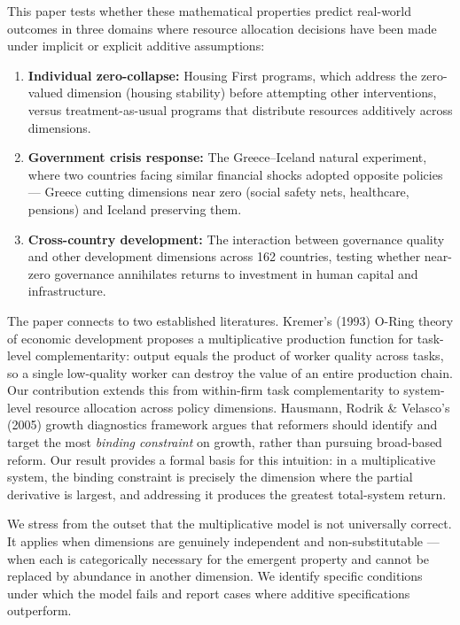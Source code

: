 \documentclass[12pt]{article}
\begin{document}
This paper tests whether these mathematical properties predict real-world outcomes in three domains where resource allocation decisions have been made under implicit or explicit additive assumptions:

\begin{enumerate}
\item \textbf{Individual zero-collapse:} Housing First programs, which address the zero-valued dimension (housing stability) before attempting other interventions, versus treatment-as-usual programs that distribute resources additively across dimensions.
\item \textbf{Government crisis response:} The Greece--Iceland natural experiment, where two countries facing similar financial shocks adopted opposite policies --- Greece cutting dimensions near zero (social safety nets, healthcare, pensions) and Iceland preserving them.
\item \textbf{Cross-country development:} The interaction between governance quality and other development dimensions across 162 countries, testing whether near-zero governance annihilates returns to investment in human capital and infrastructure.
\end{enumerate}

The paper connects to two established literatures. Kremer's (1993) O-Ring theory of economic development proposes a multiplicative production function for task-level complementarity: output equals the product of worker quality across tasks, so a single low-quality worker can destroy the value of an entire production chain. Our contribution extends this from within-firm task complementarity to system-level resource allocation across policy dimensions. Hausmann, Rodrik \& Velasco's (2005) growth diagnostics framework argues that reformers should identify and target the most \emph{binding constraint} on growth, rather than pursuing broad-based reform. Our result provides a formal basis for this intuition: in a multiplicative system, the binding constraint is precisely the dimension where the partial derivative is largest, and addressing it produces the greatest total-system return.

We stress from the outset that the multiplicative model is not universally correct. It applies when dimensions are genuinely independent and non-substitutable --- when each is categorically necessary for the emergent property and cannot be replaced by abundance in another dimension. We identify specific conditions under which the model fails and report cases where additive specifications outperform.
\end{document}
